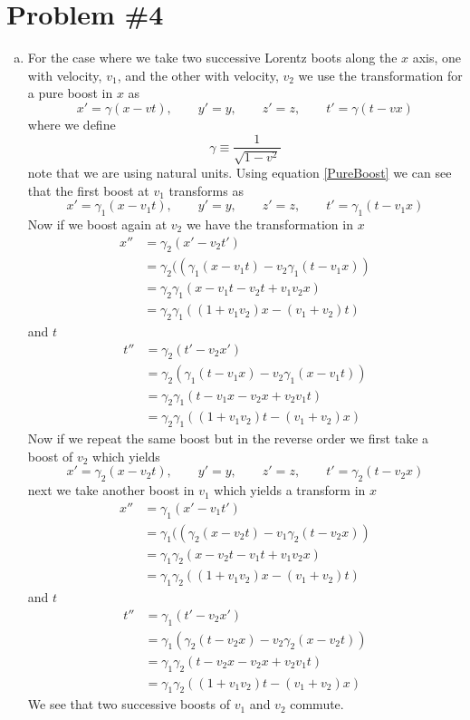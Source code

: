 \documentclass[11pt]{article}
\numberwithin{equation}{section}
\begin{document}
\section{Problem \#4}
\begin{enumerate}[(a)]
\item
    For the case where we take two successive Lorentz boots along the $x$ axis, one with velocity, $v_1$, and the 
    other with velocity, $v_2$ we use the transformation for a pure boost in $x$ as
    \begin{equation}
        x' = \gamma(x-vt),\qquad y'=y,\qquad z'=z,\qquad t'=\gamma(t-vx)
        \label{PureBoost}
    \end{equation}
   where we define
    \begin{equation} 
        \gamma\equiv\frac{1}{\sqrt{1-v^2}}
        \label{Gamma}
    \end{equation} 
    note that we are using natural units. Using equation \ref{PureBoost} we can see that the first boost at $v_1$ transforms as
    $$x' = \gamma_1(x-v_1t),\qquad y'=y,\qquad z'=z,\qquad t'=\gamma_1(t-v_1x)$$
    Now if we boost again at $v_2$ we have the transformation in $x$
    \begin{align*}
        x'' &= \gamma_2(x'-v_2t') \\
            &= \gamma_2((\gamma_1(x-v_1t)-v_2\gamma_1(t-v_1x)) \\
            &= \gamma_2\gamma_1(x-v_1t-v_2t+v_1v_2x) \\
            &= \gamma_2\gamma_1((1+v_1v_2)x-(v_1+v_2)t) 
    \end{align*}
    and $t$
    \begin{align*}
        t'' &= \gamma_2(t'-v_2x')\\
            &= \gamma_2(\gamma_1(t-v_1x)-v_2\gamma_1(x-v_1t))\\
            &= \gamma_2\gamma_1(t-v_1x-v_2x+v_2v_1t)\\
            &= \gamma_2\gamma_1((1+v_1v_2)t-(v_1+v_2)x)
    \end{align*}
    Now if we repeat the same boost but in the reverse order we first take a boost of $v_2$ which yields 
    $$x' = \gamma_2(x-v_2t),\qquad y'=y,\qquad z'=z,\qquad t'=\gamma_2(t-v_2x)$$
    next we take another boost in $v_1$ which yields a transform in $x$
    \begin{align*}
        x'' &= \gamma_1(x'-v_1t') \\
            &= \gamma_1((\gamma_2(x-v_2t)-v_1\gamma_2(t-v_2x)) \\
            &= \gamma_1\gamma_2(x-v_2t-v_1t+v_1v_2x) \\
            &= \gamma_1\gamma_2((1+v_1v_2)x-(v_1+v_2)t) 
    \end{align*}
    and $t$
    \begin{align*}
        t'' &= \gamma_1(t'-v_2x')\\
            &= \gamma_1(\gamma_2(t-v_2x)-v_2\gamma_2(x-v_2t))\\
            &= \gamma_1\gamma_2(t-v_2x-v_2x+v_2v_1t)\\
            &= \gamma_1\gamma_2((1+v_1v_2)t-(v_1+v_2)x)
    \end{align*}
    We see that two successive boosts of $v_1$ and $v_2$ commute.


\end{enumerate}
\end{document}
